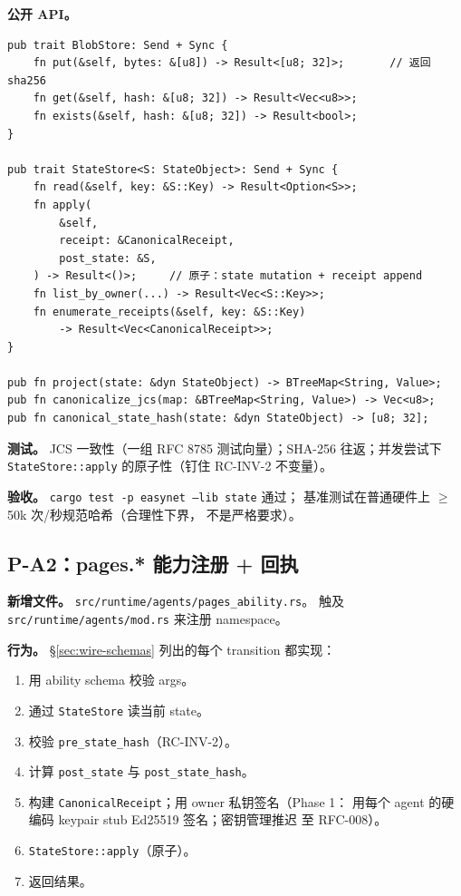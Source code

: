 \documentclass[11pt,a4paper]{article}
\theoremstyle{definition}
\begin{document}
\textbf{公开 API。}
\begin{lstlisting}
pub trait BlobStore: Send + Sync {
    fn put(&self, bytes: &[u8]) -> Result<[u8; 32]>;       // 返回 sha256
    fn get(&self, hash: &[u8; 32]) -> Result<Vec<u8>>;
    fn exists(&self, hash: &[u8; 32]) -> Result<bool>;
}

pub trait StateStore<S: StateObject>: Send + Sync {
    fn read(&self, key: &S::Key) -> Result<Option<S>>;
    fn apply(
        &self,
        receipt: &CanonicalReceipt,
        post_state: &S,
    ) -> Result<()>;     // 原子：state mutation + receipt append
    fn list_by_owner(...) -> Result<Vec<S::Key>>;
    fn enumerate_receipts(&self, key: &S::Key)
        -> Result<Vec<CanonicalReceipt>>;
}

pub fn project(state: &dyn StateObject) -> BTreeMap<String, Value>;
pub fn canonicalize_jcs(map: &BTreeMap<String, Value>) -> Vec<u8>;
pub fn canonical_state_hash(state: &dyn StateObject) -> [u8; 32];
\end{lstlisting}

\textbf{测试。} JCS 一致性（一组 RFC 8785 测试向量）；SHA-256
往返；并发尝试下 \texttt{StateStore::apply} 的原子性（钉住
RC-INV-2 不变量）。

\textbf{验收。} \texttt{cargo test -p easynet --lib state} 通过；
基准测试在普通硬件上 $\geq$ 50k 次/秒规范哈希（合理性下界，
不是严格要求）。

\subsection{P-A2：pages.* 能力注册 + 回执}

\textbf{新增文件。} \texttt{src/runtime/agents/pages\_ability.rs}。
触及 \texttt{src/runtime/agents/mod.rs} 来注册 namespace。

\textbf{行为。} \S\ref{sec:wire-schemas} 列出的每个 transition 都实现：
\begin{enumerate}[leftmargin=2.2em,itemsep=0.15em]
    \item 用 ability schema 校验 args。
    \item 通过 \texttt{StateStore} 读当前 state。
    \item 校验 \texttt{pre\_state\_hash}（RC-INV-2）。
    \item 计算 \texttt{post\_state} 与 \texttt{post\_state\_hash}。
    \item 构建 \texttt{CanonicalReceipt}；用 owner 私钥签名（Phase 1：
    用每个 agent 的硬编码 keypair stub Ed25519 签名；密钥管理推迟
    至 RFC-008）。
    \item \texttt{StateStore::apply}（原子）。
    \item 返回结果。
\end{enumerate}
\end{document}
